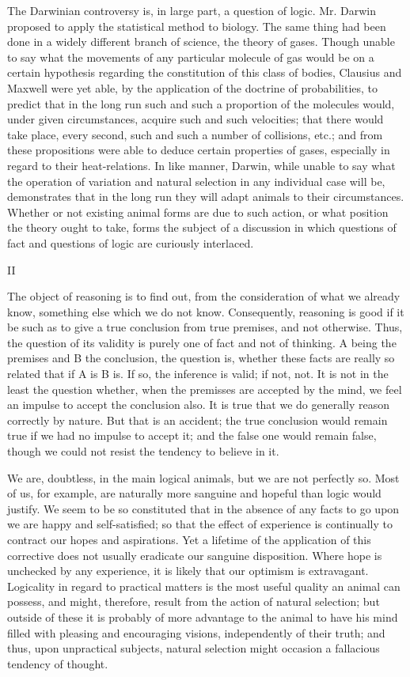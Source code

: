 \documentclass[]{article}
\newcommand*{\itemsection}[1]{\bigskip\centerline{#1}\nopagebreak}
\begin{document}
The Darwinian controversy is, in large part, a question of logic. Mr. Darwin proposed to apply the statistical method to biology. The same thing had been done in a widely different branch of science, the theory of gases. Though unable to say what the movements of any particular molecule of gas would be on a certain hypothesis regarding the constitution of this class of bodies, Clausius and Maxwell were yet able, by the application of the doctrine of probabilities, to predict that in the long run such and such a proportion of the molecules would, under given circumstances, acquire such and such velocities; that there would take place, every second, such and such a number of collisions, etc.; and from these propositions were able to deduce certain properties of gases, especially in regard to their heat-relations. In like manner, Darwin, while unable to say what the operation of variation and natural selection in any individual case will be, demonstrates that in the long run they will adapt animals to their circumstances. Whether or not existing animal forms are due to such action, or what position the theory ought to take, forms the subject of a discussion in which questions of fact and questions of logic are curiously interlaced.

\itemsection{II}

The object of reasoning is to find out, from the consideration of what we already know, something else which we do not know. Consequently, reasoning is good if it be such as to give a true conclusion from true premises, and not otherwise. Thus, the question of its validity is purely one of fact and not of thinking. A being the premises and B the conclusion, the question is, whether these facts are really so related that if A is B is. If so, the inference is valid; if not, not. It is not in the least the question whether, when the premisses are accepted by the mind, we feel an impulse to accept the conclusion also. It is true that we do generally reason correctly by nature. But that is an accident; the true conclusion would remain true if we had no impulse to accept it; and the false one would remain false, though we could not resist the tendency to believe in it.

We are, doubtless, in the main logical animals, but we are not perfectly so. Most of us, for example, are naturally more sanguine and hopeful than logic would justify. We seem to be so constituted that in the absence of any facts to go upon we are happy and self-satisfied; so that the effect of experience is continually to contract our hopes and aspirations. Yet a lifetime of the application of this corrective does not usually eradicate our sanguine disposition. Where hope is unchecked by any experience, it is likely that our optimism is extravagant. Logicality in regard to practical matters is the most useful quality an animal can possess, and might, therefore, result from the action of natural selection; but outside of these it is probably of more advantage to the animal to have his mind filled with pleasing and encouraging visions, independently of their truth; and thus, upon unpractical subjects, natural selection might occasion a fallacious tendency of thought.
\end{document}
